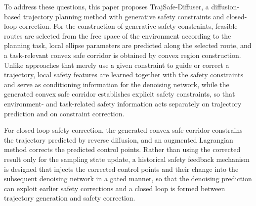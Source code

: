 \documentclass[journal]{IEEEtran}
\begin{document}
To address these questions, this paper proposes TrajSafe-Diffuser, a
diffusion-based trajectory planning method with generative safety constraints
and closed-loop correction. For the construction of generative safety
constraints, feasible routes are selected from the free space of the
environment according to the planning task, local ellipse parameters are
predicted along the selected route, and a task-relevant convex safe corridor is
obtained by convex region construction. Unlike approaches that merely use a
given constraint to guide or correct a trajectory, local safety features are
learned together with the safety constraints and serve as conditioning
information for the denoising network, while the generated convex safe corridor
establishes explicit safety constraints, so that environment- and task-related
safety information acts separately on trajectory prediction and on constraint
correction.

For closed-loop safety correction, the generated convex safe corridor
constrains the trajectory predicted by reverse diffusion, and an augmented
Lagrangian method corrects the predicted control points. Rather than using the
corrected result only for the sampling state update, a historical safety
feedback mechanism is designed that injects the corrected control points and
their change into the subsequent denoising network in a gated manner, so that
the denoising prediction can exploit earlier safety corrections and a closed
loop is formed between trajectory generation and safety correction.
\end{document}
